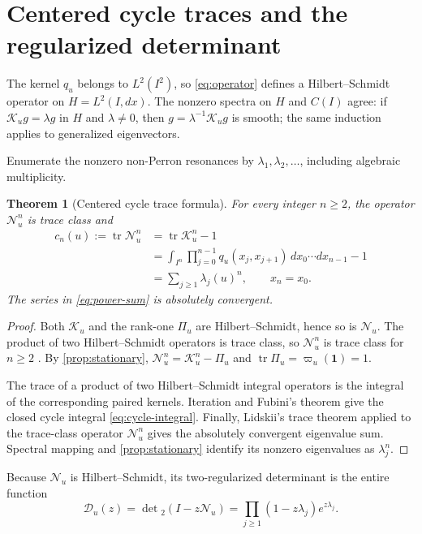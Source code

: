 \documentclass[11pt]{article}
\newtheorem{theorem}{Theorem}[section]
\theoremstyle{definition}
\theoremstyle{remark}
\newcommand{\cK}{\mathcal K}
\newcommand{\cN}{\mathcal N}
\newcommand{\cD}{\mathcal D}
\newcommand{\tr}{\operatorname{tr}}
\newcommand{\one}{\mathbf 1}
\begin{document}
\section{Centered cycle traces and the regularized determinant}
\label{sec:traces}

The kernel $q_u$ belongs to $L^2(I^2)$, so \eqref{eq:operator} defines a
Hilbert--Schmidt operator on $H=L^2(I,dx)$.  The nonzero spectra on $H$ and
$C(I)$ agree: if $\cK_ug=\lambda g$ in $H$ and $\lambda\ne0$, then
$g=\lambda^{-1}\cK_ug$ is smooth; the same induction applies to generalized
eigenvectors.

Enumerate the nonzero non-Perron resonances by
$\lambda_1,\lambda_2,\ldots$, including algebraic multiplicity.

\begin{theorem}[Centered cycle trace formula]
\label{thm:trace}
For every integer $n\ge2$, the operator $\cN_u^n$ is trace class and
\begin{align}
 c_n(u):=\tr\cN_u^n
 &=\tr\cK_u^n-1\label{eq:centered-trace}\\
 &=\int_{I^n}\prod_{j=0}^{n-1}q_u(x_j,x_{j+1})
 \,dx_0\cdots dx_{n-1}-1\label{eq:cycle-integral}\\
 &=\sum_{j\ge1}\lambda_j(u)^n,
 \qquad x_n=x_0.\label{eq:power-sum}
\end{align}
The series in \eqref{eq:power-sum} is absolutely convergent.
\end{theorem}

\begin{proof}
Both $\cK_u$ and the rank-one $\Pi_u$ are Hilbert--Schmidt, hence so is
$\cN_u$.  The product of two Hilbert--Schmidt operators is trace class, so
$\cN_u^n$ is trace class for $n\ge2$ \citep{Simon2005}.  By
\cref{prop:stationary}, $\cN_u^n=\cK_u^n-\Pi_u$ and $\tr\Pi_u=\varpi_u(\one)=1$.

The trace of a product of two Hilbert--Schmidt integral operators is the
integral of the corresponding paired kernels.  Iteration and Fubini's theorem
give the closed cycle integral \eqref{eq:cycle-integral}.  Finally, Lidskii's
trace theorem applied to the trace-class operator $\cN_u^n$ gives the
absolutely convergent eigenvalue sum.  Spectral mapping and
\cref{prop:stationary} identify its nonzero eigenvalues as $\lambda_j^n$.
\end{proof}

Because $\cN_u$ is Hilbert--Schmidt, its two-regularized determinant is the
entire function
\begin{equation}\label{eq:det2}
 \cD_u(z)=\det{}_2(I-z\cN_u)
 =\prod_{j\ge1}(1-z\lambda_j)e^{z\lambda_j}.
\end{equation}
\end{document}
